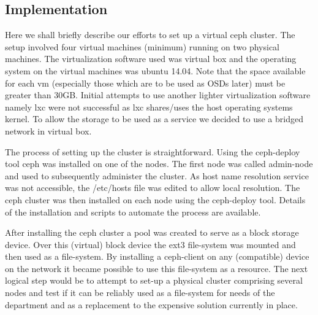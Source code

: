 \documentclass[a4paper,10pt]{article}
\begin{document}
\subsection{Implementation}
    Here we shall briefly describe our efforts to set up a virtual ceph cluster. The setup involved four virtual machines (minimum) running on two physical machines. The virtualization software used was virtual box and the operating system on the virtual machines was ubuntu 14.04. Note that the space available for each vm (especially those which are to be used as OSDs later) must be greater than 30GB. Initial attempts to use another lighter virtualization software namely lxc were not successful as lxc shares/uses the host operating systems kernel. To allow the storage to be used as a service we decided to use a bridged network in virtual box.


    The process of setting up the cluster is straightforward. Using the ceph-deploy tool ceph was installed on one of the nodes. The first node was called admin-node and used to subsequently administer the cluster. As host name resolution service was not accessible, the /etc/hosts file was edited to allow local resolution. The ceph cluster was then installed on each node using the ceph-deploy tool. Details of the installation and scripts to automate the process are available.
    
    After installing the ceph cluster a pool was created to serve as a block storage device. Over this (virtual) block device the ext3 file-system was mounted and then used as a file-system. By installing a ceph-client on any (compatible) device on the network it became possible to use this file-system as a resource. The next logical step would be to attempt to set-up a physical cluster comprising several nodes and test if it can be reliably used as a file-system for needs of the department and as a replacement to the expensive solution currently in place.

\medskip


\end{document}
